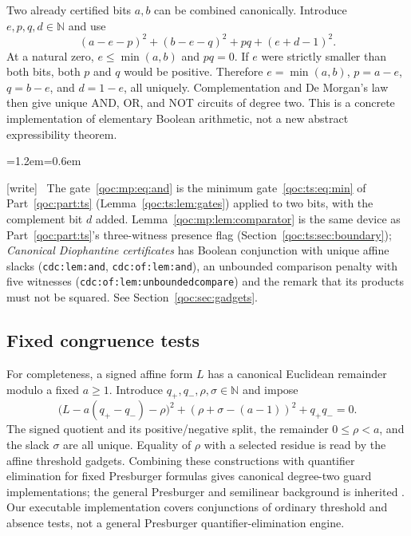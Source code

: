 \documentclass[11pt,letterpaper]{article}
\theoremstyle{definition}
\theoremstyle{remark}
\newcommand{\N}{\mathbb N}
\newcommand{\wtag}{\textup{[write]}}
\newenvironment{writenote}{\par\smallskip\begin{list}{}{\leftmargin=1.2em\rightmargin=0.6em}\item[]\small\wtag\ }{\end{list}\smallskip}
\newcommand{\lab}[1]{\nolinkurl{#1}}
\begin{document}
Two already certified bits $a,b$ can be combined canonically. Introduce
$e,p,q,d\in\N$ and use
\begin{equation}\label{qoc:mp:eq:and}
 (a-e-p)^2+(b-e-q)^2+pq+(e+d-1)^2.
\end{equation}
At a natural zero, $e\le\min(a,b)$ and $pq=0$. If $e$ were strictly
smaller than both bits, both $p$ and $q$ would be positive. Therefore
$e=\min(a,b)$, $p=a-e$, $q=b-e$, and $d=1-e$, all uniquely. Complementation
and De Morgan's law then give unique AND, OR, and NOT circuits of degree
two. This is a concrete implementation of elementary Boolean arithmetic,
not a new abstract expressibility theorem.

\begin{writenote}
The gate~\eqref{qoc:mp:eq:and} is the minimum gate~\eqref{qoc:ts:eq:min} of Part~\ref{qoc:part:ts} (Lemma~\ref{qoc:ts:lem:gates}) applied to two bits, with the complement bit $d$ added. Lemma~\ref{qoc:mp:lem:comparator} is the same device as Part~\ref{qoc:part:ts}'s three-witness presence flag (Section~\ref{qoc:ts:sec:boundary}); \emph{Canonical Diophantine certificates} has Boolean conjunction with unique affine slacks (\lab{cdc:lem:and}, \lab{cdc:of:lem:and}), an unbounded comparison penalty with five witnesses (\lab{cdc:of:lem:unboundedcompare}) and the remark that its products must not be squared. See Section~\ref{qoc:sec:gadgets}.
\end{writenote}

\subsection{Fixed congruence tests}
For completeness, a signed affine form $L$ has a canonical Euclidean
remainder modulo a fixed $a\ge1$. Introduce $q_+,q_-,\rho,\sigma\in\N$
and impose
\begin{equation}\label{qoc:mp:eq:mod}
 \bigl(L-a(q_+-q_-)-\rho\bigr)^2
 +(\rho+\sigma-(a-1))^2+q_+q_-=0.
\end{equation}
The signed quotient and its positive/negative split, the remainder
$0\le\rho<a$, and the slack $\sigma$ are all unique. Equality of $\rho$
with a selected residue is read by the affine threshold gadgets. Combining
these constructions with quantifier elimination for fixed Presburger
formulas gives canonical degree-two guard implementations; the general
Presburger and semilinear background is inherited
\cite{mp:woods,mp:repo-canonical}. Our executable implementation covers
conjunctions of ordinary threshold and absence tests, not a general
Presburger quantifier-elimination engine.
\end{document}
